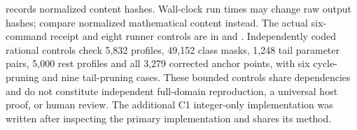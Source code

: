  records normalized content hashes. Wall-clock run times may change raw output hashes; compare normalized mathematical content instead. The actual six-command receipt and eight runner controls are in  and . Independently coded rational controls check 5,832 profiles, 49,152 class masks, 1,248 tail parameter pairs, 5,000 rest profiles and all 3,279 corrected anchor points, with six cycle-pruning and nine tail-pruning cases. These bounded controls share dependencies and do not constitute independent full-domain reproduction, a universal host proof, or human review. The additional C1 integer-only implementation was written after inspecting the primary implementation and shares its method.
